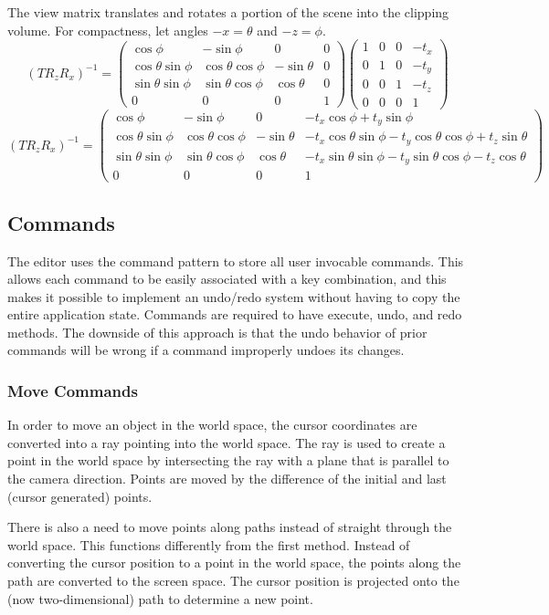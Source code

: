 \documentclass[10pt]{article}
\newcommand\m[1]{\begin{pmatrix}#1\end{pmatrix}}
\begin{document}
The view matrix translates and rotates a portion of the scene into the clipping volume. For compactness, let angles $ -x = \theta $ and $ -z = \phi $.
\[ (TR_zR_x)^{-1} = \m{
\cos\phi & -\sin\phi & 0 & 0 \\
\cos\theta \sin\phi & \cos\theta \cos\phi & -\sin\theta & 0 \\
\sin\theta \sin\phi & \sin\theta \cos\phi & \cos\theta & 0 \\
0 & 0 & 0 & 1} \m{
1 & 0 & 0 & -t_x \\
0 & 1 & 0 & -t_y \\
0 & 0 & 1 & -t_z \\
0 & 0 & 0 & 1} \]
\[ (TR_zR_x)^{-1} = \m{
\cos\phi & -\sin\phi & 0 & -t_x\cos\phi+t_y\sin\phi \\
\cos\theta \sin\phi & \cos\theta \cos\phi & -\sin\theta & -t_x\cos\theta\sin\phi-t_y\cos\theta\cos\phi+t_z\sin\theta \\
\sin\theta \sin\phi & \sin\theta \cos\phi & \cos\theta & -t_x\sin\theta\sin\phi-t_y\sin\theta\cos\phi-t_z\cos\theta \\
0 & 0 & 0 & 1} \]

\subsection{Commands}
The editor uses the command pattern to store all user invocable commands. This allows each command to be easily associated with a key combination, and this makes it possible to implement an undo/redo system without having to copy the entire application state. Commands are required to have execute, undo, and redo methods. The downside of this approach is that the undo behavior of prior commands will be wrong if a command improperly undoes its changes.

\subsubsection{Move Commands}
In order to move an object in the world space, the cursor coordinates are converted into a ray pointing into the world space. The ray is used to create a point in the world space by intersecting the ray with a plane that is parallel to the camera direction. Points are moved by the difference of the initial and last (cursor generated) points.

There is also a need to move points along paths instead of straight through the world space. This functions differently from the first method. Instead of converting the cursor position to a point in the world space, the points along the path are converted to the screen space. The cursor position is projected onto the (now two-dimensional) path to determine a new point.
\end{document}
